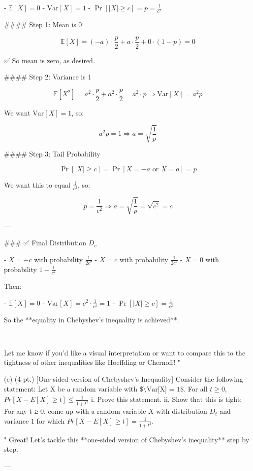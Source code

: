 - \( \mathbb{E}[X] = 0 \)
- \( \text{Var}[X] = 1 \)
- \( \Pr[|X| \ge c] = p = \frac{1}{c^2} \)

#### Step 1: Mean is 0

\[
\mathbb{E}[X] = (-a)\cdot\frac{p}{2} + a\cdot\frac{p}{2} + 0\cdot(1 - p) = 0
\]

✅ So mean is zero, as desired.

#### Step 2: Variance is 1

\[
\mathbb{E}[X^2] = a^2 \cdot \frac{p}{2} + a^2 \cdot \frac{p}{2} = a^2 \cdot p
\Rightarrow \text{Var}[X] = a^2 p
\]

We want \( \text{Var}[X] = 1 \), so:

\[
a^2 p = 1 \Rightarrow a = \sqrt{\frac{1}{p}}
\]

#### Step 3: Tail Probability

\[
\Pr[|X| \ge c] = \Pr[X = -a \text{ or } X = a] = p
\]

We want this to equal \( \frac{1}{c^2} \), so:

\[
p = \frac{1}{c^2}
\Rightarrow a = \sqrt{\frac{1}{p}} = \sqrt{c^2} = c
\]

---

### ✅ Final Distribution \( D_c \)

- \( X = -c \) with probability \( \frac{1}{2c^2} \)
- \( X = c \) with probability \( \frac{1}{2c^2} \)
- \( X = 0 \) with probability \( 1 - \frac{1}{c^2} \)

Then:

- \( \mathbb{E}[X] = 0 \)
- \( \text{Var}[X] = c^2 \cdot \frac{1}{c^2} = 1 \)
- \( \Pr[|X| \ge c] = \frac{1}{c^2} \)

So the **equality in Chebyshev's inequality is achieved**.

---

Let me know if you'd like a visual interpretation or want to compare this to the tightness of other inequalities like Hoeffding or Chernoff!
"

(c) (4 pt.) [One-sided version of Chebyshev's Inequality] Consider the following statement: Let X be a random variable with $\Var[X] = 1$. For all $t \ge 0$, $Pr[X - E[X] \ge t] \le \frac{1}{1+t^2}$
i. Prove this statement.
ii. Show that this is tight: For any t ≥ 0, come up with a random variable $X$ with distribution $D_t$ and variance $1$ for which $Pr[X - E[X] \ge t] = \frac{1}{1+t^2}$.

"
Great! Let's tackle this **one-sided version of Chebyshev's inequality** step by step.

---

